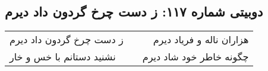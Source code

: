 \begin{center}
\section*{دوبیتی شماره ۱۱۷: ز دست چرخ گردون داد دیرم}
\label{sec:117}
\begin{longtable}{l p{0.5cm} r}
ز دست چرخ گردون داد دیرم
&&
هزاران ناله و فریاد دیرم
\\
نشنید دستانم با خس و خار
&&
چگونه خاطر خود شاد دیرم
\\
\end{longtable}
\end{center}
